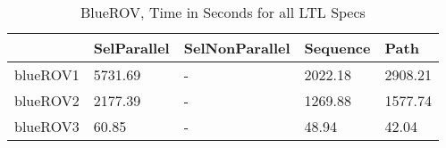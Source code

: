 \begin{table}
\centering
\caption{BlueROV, Time in Seconds for all LTL Specs}
\label{ROV_LTL_battery_time}
\begin{tabular}{lllll}
\toprule
{} & SelParallel & SelNonParallel & Sequence &     Path \\
\midrule
blueROV1 &     5731.69 &              - &  2022.18 &  2908.21 \\
blueROV2 &     2177.39 &              - &  1269.88 &  1577.74 \\
blueROV3 &       60.85 &              - &    48.94 &    42.04 \\
\bottomrule
\end{tabular}
\end{table}

